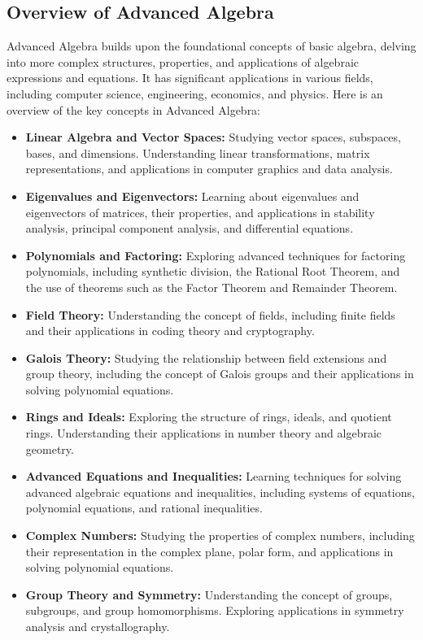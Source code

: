 \documentclass[openany]{book}
\begin{document}
\subsection{Overview of Advanced Algebra}
Advanced Algebra builds upon the foundational concepts of basic algebra, delving into more complex structures, properties, and applications of algebraic expressions and equations. It has significant applications in various fields, including computer science, engineering, economics, and physics. Here is an overview of the key concepts in Advanced Algebra:
\begin{itemize}
    \item \textbf{Linear Algebra and Vector Spaces:} Studying vector spaces, subspaces, bases, and dimensions. Understanding linear transformations, matrix representations, and applications in computer graphics and data analysis.
    \item \textbf{Eigenvalues and Eigenvectors:} Learning about eigenvalues and eigenvectors of matrices, their properties, and applications in stability analysis, principal component analysis, and differential equations.
    \item \textbf{Polynomials and Factoring:} Exploring advanced techniques for factoring polynomials, including synthetic division, the Rational Root Theorem, and the use of theorems such as the Factor Theorem and Remainder Theorem.
    \item \textbf{Field Theory:} Understanding the concept of fields, including finite fields and their applications in coding theory and cryptography.
    \item \textbf{Galois Theory:} Studying the relationship between field extensions and group theory, including the concept of Galois groups and their applications in solving polynomial equations.
    \item \textbf{Rings and Ideals:} Exploring the structure of rings, ideals, and quotient rings. Understanding their applications in number theory and algebraic geometry.
    \item \textbf{Advanced Equations and Inequalities:} Learning techniques for solving advanced algebraic equations and inequalities, including systems of equations, polynomial equations, and rational inequalities.
    \item \textbf{Complex Numbers:} Studying the properties of complex numbers, including their representation in the complex plane, polar form, and applications in solving polynomial equations.
    \item \textbf{Group Theory and Symmetry:} Understanding the concept of groups, subgroups, and group homomorphisms. Exploring applications in symmetry analysis and crystallography.

\end{itemize}
\end{document}
